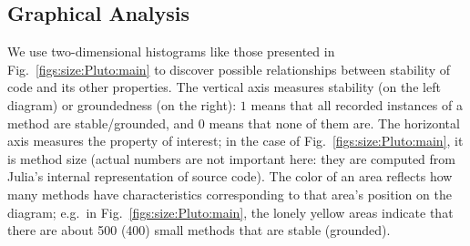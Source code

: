 \subsection{Graphical Analysis}
\label{sssect:graphs}

We use two-dimensional histograms like those presented in
Fig.~\ref{figs:size:Pluto:main} to discover possible relationships between stability
of code and its other properties. The vertical axis measures stability (on the
left diagram) or groundedness (on the right): $1$ means that all recorded
instances of a method are stable/grounded, and $0$ means that none of them are.
The horizontal axis measures the property of interest; in the case of
Fig.~\ref{figs:size:Pluto:main}, it is method size (actual numbers are not
important here: they are computed from Julia's internal representation of source
code). The color of an area reflects how many methods have characteristics
corresponding to that area's position on the diagram; e.g.\ in
Fig.~\ref{figs:size:Pluto:main}, the lonely yellow areas indicate that there are about
500 (400) small methods that are stable (grounded).

